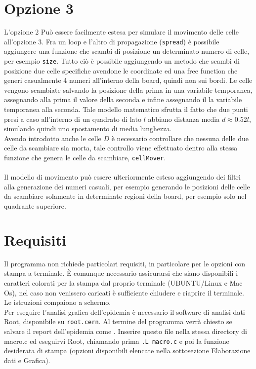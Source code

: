 \documentclass[a4paper]{article}
\begin{document}
\section{Opzione 3}
L'opzione 2 Può essere facilmente estesa per simulare il movimento delle celle all'opzione 3. Fra un loop e l'altro di propagazione (\texttt{spread}) è possibile aggiungere una funzione che scambi di posizione un determinato numero di celle, per esempio \texttt{size}. Tutto ciò è possibile aggiungendo un metodo che scambi di posizione due celle specifiche avendone le coordinate ed una free function che generi casualmente 4 numeri all'interno della board, quindi non sui bordi. Le celle vengono scambiate salvando la posizione della prima in una variabile temporanea, assegnando alla prima il valore della seconda e infine assegnando il la variabile temporanea alla seconda. Tale modello matematico sfrutta il fatto che due punti presi a caso all'interno di un quadrato di lato $l$ abbiano distanza media $d \approx 0.52l$, simulando quindi uno spostamento di media lunghezza.\\
Avendo introdotto anche le celle $D$ è necessario controllare che nessuna delle due celle da scambiare sia morta, tale controllo viene effettuato dentro alla stessa funzione che genera le celle da scambiare, \texttt{cellMover}.\\ \\
Il modello di movimento può essere ulteriormente esteso aggiungendo dei filtri alla generazione dei numeri casuali, per esempio generando le posizioni delle celle da scambiare solamente in determinate regioni della board, per esempio solo nel quadrante superiore.\\

\section{Requisiti}
Il programma non richiede particolari requisiti, in particolare per le opzioni con stampa a terminale. \`E comunque necessario assicurarsi che siano disponibili i caratteri colorati per la stampa dal proprio terminale (UBUNTU/Linux e Mac Os), nel caso non venissero caricati è sufficiente chiudere e riaprire il terminale.\\
Le istruzioni compaiono a schermo.\\
Per eseguire l'analisi grafica dell'epidemia è necessario il software di analisi dati Root, disponibile su \texttt{root.cern}.
Al termine del programma verrà chiesto se salvare il report dell'epidemia come . Inserire questo file nella stessa directory di macro.c ed eseguirvi Root, chiamando prima \texttt{.L macro.c} e poi la funzione desiderata di stampa (opzioni disponibili elencate nella sottosezione Elaborazione dati e Grafica).
\end{document}
